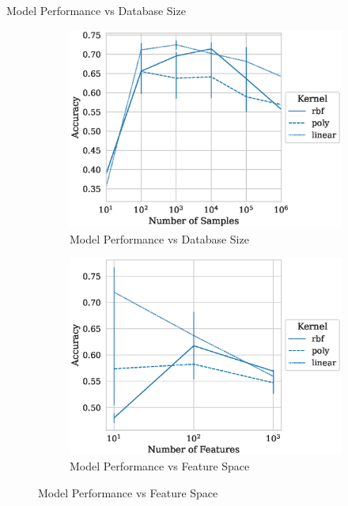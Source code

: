 \documentclass{beamer}
\begin{document}
\begin{frame}{Model Performance vs Database Size}
  \begin{figure}
    \centering
    \begin{subfigure}{.45\textwidth}
      \centering
      \includegraphics[width=\textwidth]{./generated/accuracy_vs_samples.eps}
      \caption{Model Performance vs Database Size}
    \end{subfigure}
    \hfill
    \begin{subfigure}{.45\textwidth}
      \centering
      \includegraphics[width=\textwidth]{./generated/accuracy_vs_features.eps}
      \caption{Model Performance vs Feature Space}
    \end{subfigure}
  \end{figure}
\end{frame}
\end{document}
